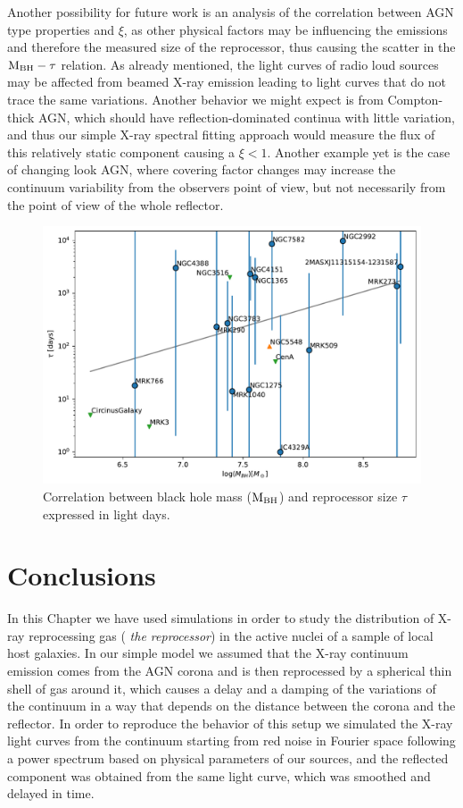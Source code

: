 Another possibility for future work is an analysis of the correlation between AGN type properties and $\xi$, as other physical factors may be influencing the emissions and therefore the measured size of the reprocessor, thus causing the scatter in the ${\rm M}_{\rm BH} - \tau$ relation. As already mentioned, the light curves of radio loud sources may be affected from beamed X-ray emission leading to light curves that do not trace the same variations. Another behavior we might expect is from Compton-thick AGN, which should have reflection-dominated continua with little variation, and thus our simple X-ray spectral fitting approach would measure the flux of this relatively static component causing a $\xi<1$. Another example yet is the case of changing look AGN, where covering factor changes may increase the continuum variability from the observers point of view, but not necessarily from the point of view of the whole reflector.
\begin{figure}
\begin{center}
    {
  \includegraphics[width=\textwidth]{Figs/Chapter5/tau_mass_corr.pdf} \hfill 
  \caption{Correlation between black hole mass (${\rm M}_{\rm BH}$) and reprocessor size $\tau$ expressed in light days.}
    \label{fig:tau_mass_corr}
  }
\end{center}
\end{figure}

\section{Conclusions}
In this Chapter we have used simulations in order to study the distribution of X-ray reprocessing gas (\emph{ the reprocessor}) in the active nuclei of a sample of local host galaxies. 
In our simple model we assumed that the X-ray continuum emission comes from the AGN corona and is then reprocessed by a spherical thin shell of gas around it, which causes a delay and a damping of the variations of the continuum in a way that depends on the distance between the corona and the reflector. In order to reproduce the behavior of this setup we simulated the X-ray light curves from the continuum starting from red noise in Fourier space following a power spectrum based on physical parameters of our sources, and the reflected component was obtained from the same light curve, which was smoothed and delayed in time.

